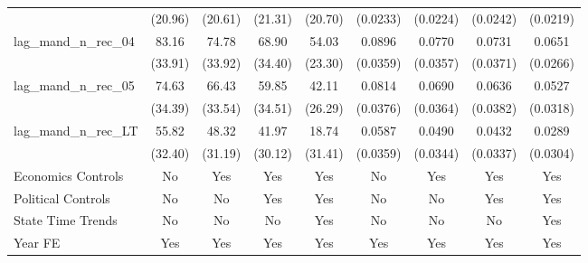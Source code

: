 {\begin{longtable}{l*{8}{c}}
                    &     (20.96)         &     (20.61)         &     (21.31)         &     (20.70)         &    (0.0233)         &    (0.0224)         &    (0.0242)         &    (0.0219)         \\
[1em]
lag\_mand\_n\_rec\_04   &       83.16\sym{**} &       74.78\sym{**} &       68.90\sym{*}  &       54.03\sym{**} &      0.0896\sym{**} &      0.0770\sym{**} &      0.0731\sym{**} &      0.0651\sym{**} \\
                    &     (33.91)         &     (33.92)         &     (34.40)         &     (23.30)         &    (0.0359)         &    (0.0357)         &    (0.0371)         &    (0.0266)         \\
[1em]
lag\_mand\_n\_rec\_05   &       74.63\sym{**} &       66.43\sym{*}  &       59.85\sym{*}  &       42.11         &      0.0814\sym{**} &      0.0690\sym{*}  &      0.0636\sym{*}  &      0.0527\sym{*}  \\
                    &     (34.39)         &     (33.54)         &     (34.51)         &     (26.29)         &    (0.0376)         &    (0.0364)         &    (0.0382)         &    (0.0318)         \\
[1em]
lag\_mand\_n\_rec\_LT   &       55.82\sym{*}  &       48.32         &       41.97         &       18.74         &      0.0587         &      0.0490         &      0.0432         &      0.0289         \\
                    &     (32.40)         &     (31.19)         &     (30.12)         &     (31.41)         &    (0.0359)         &    (0.0344)         &    (0.0337)         &    (0.0304)         \\
[1em]
Economics Controls  &          No         &         Yes         &         Yes         &         Yes         &          No         &         Yes         &         Yes         &         Yes         \\
[1em]
Political Controls  &          No         &          No         &         Yes         &         Yes         &          No         &          No         &         Yes         &         Yes         \\
[1em]
State Time Trends   &          No         &          No         &          No         &         Yes         &          No         &          No         &          No         &         Yes         \\
[1em]
Year FE             &         Yes         &         Yes         &         Yes         &         Yes         &         Yes         &         Yes         &         Yes         &         Yes         \\

\end{longtable}}
